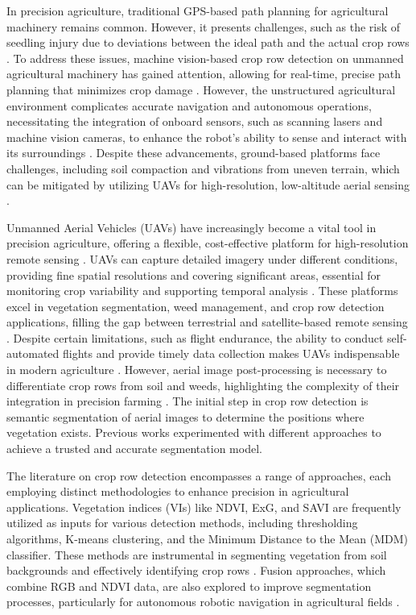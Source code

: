 \documentclass[conference]{IEEEtran}
\begin{document}
In precision agriculture, traditional GPS-based path planning for agricultural machinery remains common. However, it presents challenges, such as the risk of seedling injury due to deviations between the ideal path and the actual crop rows \cite{b1}. To address these issues, machine vision-based crop row detection on unmanned agricultural machinery has gained attention, allowing for real-time, precise path planning that minimizes crop damage \cite{b1,b8}. However, the unstructured agricultural environment complicates accurate navigation and autonomous operations, necessitating the integration of onboard sensors, such as scanning lasers and machine vision cameras, to enhance the robot's ability to sense and interact with its surroundings \cite{b2,b3}. Despite these advancements, ground-based platforms face challenges, including soil compaction and vibrations from uneven terrain, which can be mitigated by utilizing UAVs for high-resolution, low-altitude aerial sensing \cite{b10}.

Unmanned Aerial Vehicles (UAVs) have increasingly become a vital tool in precision agriculture, offering a flexible, cost-effective platform for high-resolution remote sensing  \cite{b9,b12}. UAVs can capture detailed imagery under different conditions, providing fine spatial resolutions and covering significant areas, essential for monitoring crop variability and supporting temporal analysis \cite{b10,b12}. These platforms excel in vegetation segmentation, weed management, and crop row detection applications, filling the gap between terrestrial and satellite-based remote sensing \cite{b7,b13}. Despite certain limitations, such as flight endurance, the ability to conduct self-automated flights and provide timely data collection makes UAVs indispensable in modern agriculture \cite{b11,b13}. However, aerial image post-processing is necessary to differentiate crop rows from soil and weeds, highlighting the complexity of their integration in precision farming \cite{b6}.
The initial step in crop row detection is semantic segmentation of aerial images to determine the positions where vegetation exists. Previous works experimented with different approaches to achieve a trusted and accurate segmentation model.


The literature on crop row detection encompasses a range of approaches, each employing distinct methodologies to enhance precision in agricultural applications. Vegetation indices (VIs) like NDVI, ExG, and SAVI are frequently utilized as inputs for various detection methods, including thresholding algorithms, K-means clustering, and the Minimum Distance to the Mean (MDM) classifier. These methods are instrumental in segmenting vegetation from soil backgrounds and effectively identifying crop rows \cite{b1,b6,b13}. Fusion approaches, which combine RGB and NDVI data, are also explored to improve segmentation processes, particularly for autonomous robotic navigation in agricultural fields \cite{b5}.
\end{document}
